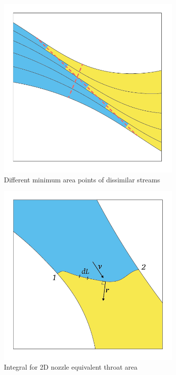 \documentclass[11pt, twoside]{report}
\begin{document}
\begin{figure}[H]
	\centering
	\begin{subfigure}{.45\textwidth}
		\centering
		\includegraphics[width=\linewidth]{figs/illustration_of_minimum_area_ver04.png}
		\caption{Different minimum area points of dissimilar streams}
		\label{fig:illustration_of_minimum_area}
	\end{subfigure}
	\hspace{0.05\textwidth}
	\begin{subfigure}{.45\textwidth}
		\centering
		\includegraphics[width=\linewidth]{figs/illustration_of_equivalent_throat_area_integral_ver03.png}
		\caption{Integral for 2D nozzle equivalent throat area}
		\label{fig:illustration_of_equivalent_throat_area_integral}
	\end{subfigure}
	\caption{}
\end{figure}
 		
\end{document}
